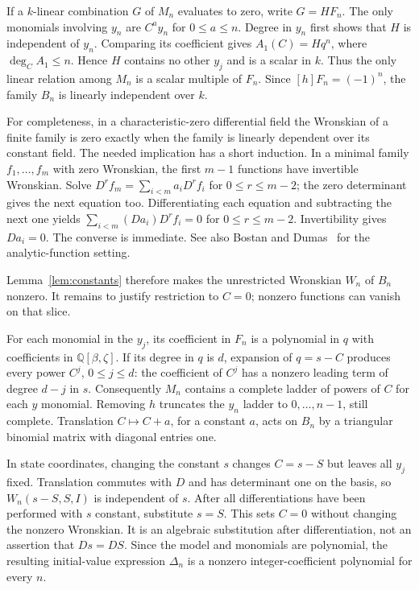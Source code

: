 \documentclass[11pt,a4paper]{article}
\newcommand{\Q}{\mathbb{Q}}
\begin{document}
If a $k$-linear combination $G$ of $M_n$ evaluates to zero, write $G=H F_n$. The only monomials involving $y_n$ are $C^ay_n$ for $0\leq a\leq n$. Degree in $y_n$ first shows that $H$ is independent of $y_n$. Comparing its coefficient gives $A_1(C)=Hq^n$, where $\deg_C A_1\leq n$. Hence $H$ contains no other $y_j$ and is a scalar in $k$. Thus the only linear relation among $M_n$ is a scalar multiple of $F_n$. Since $[h]F_n=(-1)^n$, the family $B_n$ is linearly independent over $k$.

For completeness, in a characteristic-zero differential field the Wronskian of a finite family is zero exactly when the family is linearly dependent over its constant field. The needed implication has a short induction. In a minimal family $f_1,\ldots,f_m$ with zero Wronskian, the first $m-1$ functions have invertible Wronskian. Solve
$D^rf_m=\sum_{i<m}a_iD^rf_i$ for $0\leq r\leq m-2$; the zero determinant gives the next equation too. Differentiating each equation and subtracting the next one yields
$\sum_{i<m}(Da_i)D^rf_i=0$ for $0\leq r\leq m-2$. Invertibility gives $Da_i=0$. The converse is immediate. See also Bostan and Dumas~\cite{BD} for the analytic-function setting.

Lemma~\ref{lem:constants} therefore makes the unrestricted Wronskian $W_n$ of $B_n$ nonzero. It remains to justify restriction to $C=0$; nonzero functions can vanish on that slice.

For each monomial in the $y_j$, its coefficient in $F_n$ is a polynomial in $q$ with coefficients in $\Q[\beta,\zeta]$. If its degree in $q$ is $d$, expansion of $q=s-C$ produces every power $C^j$, $0\leq j\leq d$: the coefficient of $C^j$ has a nonzero leading term of degree $d-j$ in $s$. Consequently $M_n$ contains a complete ladder of powers of $C$ for each $y$ monomial. Removing $h$ truncates the $y_n$ ladder to $0,\ldots,n-1$, still complete. Translation $C\mapsto C+a$, for a constant $a$, acts on $B_n$ by a triangular binomial matrix with diagonal entries one.

In state coordinates, changing the constant $s$ changes $C=s-S$ but leaves all $y_j$ fixed. Translation commutes with $D$ and has determinant one on the basis, so $W_n(s-S,S,I)$ is independent of $s$. After all differentiations have been performed with $s$ constant, substitute $s=S$. This sets $C=0$ without changing the nonzero Wronskian. It is an algebraic substitution after differentiation, not an assertion that $Ds=DS$. Since the model and monomials are polynomial, the resulting initial-value expression $\Delta_n$ is a nonzero integer-coefficient polynomial for every $n$.
\end{document}
